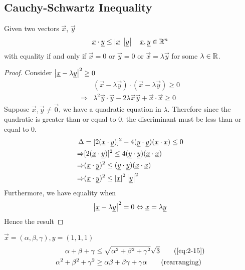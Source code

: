 \documentclass{article}
\numberwithin{equation}{section}
\begin{document}
\subsection{Cauchy-Schwartz Inequality}
\begin{thm}[CS Inequality]
    Given two vectors $\vec{x}$, $\vec{y}$
    \begin{equation}
        \underline{x} \cdot \underline{y} \leq \left\lvert \underline{x}\right\rvert\left\lvert \underline{y}\right\rvert \quad \underline{x}, \underline{y} \in \mathbb{R}^n
    \end{equation}
    with equality if and only if $\vec{x} = 0$ or $\vec{y} = 0$ or $\vec{x} = \lambda \vec{y}$ for some $\lambda \in \mathbb{R}$.
\end{thm}
\begin{proof}
    Consider $\left\lvert \underline{x} - \lambda \underline{y}\right\rvert^2 \geq 0$
    \begin{align*}
        &(\vec{x} - \lambda \vec{y}) \cdot (\vec{x} - \lambda \vec{y}) \geq 0 \\
        \Rightarrow& \lambda^2 \vec{y} \cdot \vec{y} - 2\lambda\vec{x}\vec{y} + \vec{x} \cdot \vec{x} \geq 0
    \end{align*}
    Suppose $\vec{x}, \vec{y} \neq \vec{0}$, we have a quadratic equation in $\lambda$. Therefore since the quadratic is greater than or equal to $0$, the discriminant must be less than or equal to $0$.
    \begin{align*}
        \Delta &= [2(\underline{x} \cdot \underline{y})]^2 - 4 (\underline{y} \cdot \underline{y})(\underline{x} \cdot \underline{x}) \leq 0 \\
        \Rightarrow& [2(\underline{x} \cdot \underline{y})]^2 \leq 4 (\underline{y} \cdot \underline{y})(\underline{x} \cdot \underline{x}) \\
        \Rightarrow& (\underline{x} \cdot \underline{y})^2 \leq (\underline{y} \cdot \underline{y})(\underline{x} \cdot \underline{x}) \\
        \Rightarrow& (\underline{x} \cdot \underline{y})^2 \leq \left\lvert \underline{x}\right\rvert^2\left\lvert \underline{y}\right\rvert^2
    \end{align*}
    Furthermore, we have equality when
    \[
        \left\lvert \underline{x} - \lambda \underline{y}\right\rvert^2 = 0 \Leftrightarrow \underline{x} = \lambda \underline{y}
    \]
    Hence the result
\end{proof}

\begin{eg} $\vec{x} = (\alpha, \beta, \gamma), y = (1, 1, 1)$
    \begin{align*}
        \alpha + \beta + \gamma &\leq \sqrt{\alpha^2 + \beta^2 + \gamma^2} \sqrt{3} \tag{\ref{eq:2-15}} \\
        \alpha^2 + \beta^2 + \gamma^2 &\geq \alpha\beta + \beta\gamma + \gamma\alpha \tag{rearranging}
    \end{align*}
\end{eg}
\end{document}
